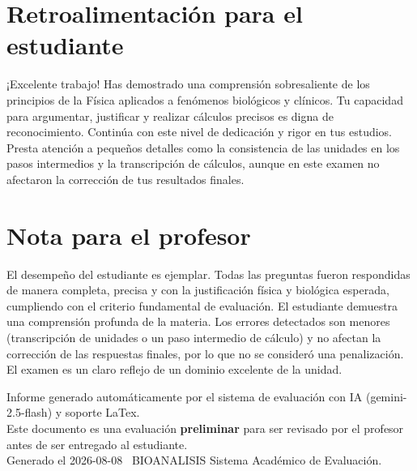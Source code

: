 \documentclass[11pt,a4paper]{article}
\begin{document}
\section*{Retroalimentación para el estudiante}
\begin{tcolorbox}[cajaRecomendacion, title={Dirigido a: Maria Frontado}]
¡Excelente trabajo! Has demostrado una comprensión sobresaliente de los principios de la Física aplicados a fenómenos biológicos y clínicos. Tu capacidad para argumentar, justificar y realizar cálculos precisos es digna de reconocimiento. Continúa con este nivel de dedicación y rigor en tus estudios. Presta atención a pequeños detalles como la consistencia de las unidades en los pasos intermedios y la transcripción de cálculos, aunque en este examen no afectaron la corrección de tus resultados finales.
\end{tcolorbox}

\section*{Nota para el profesor}
\begin{tcolorbox}[
  enhanced, breakable,
  colback=yellow!8, colframe=yellow!60!black,
  fonttitle=\bfseries, coltitle=black,
  title={Observaciones para revisión manual},
  top=4pt, bottom=4pt, left=8pt, right=8pt,
]
El desempeño del estudiante es ejemplar. Todas las preguntas fueron respondidas de manera completa, precisa y con la justificación física y biológica esperada, cumpliendo con el criterio fundamental de evaluación. El estudiante demuestra una comprensión profunda de la materia. Los errores detectados son menores (transcripción de unidades o un paso intermedio de cálculo) y no afectan la corrección de las respuestas finales, por lo que no se consideró una penalización. El examen es un claro reflejo de un dominio excelente de la unidad.
\end{tcolorbox}

\vspace{12pt}
\begin{center}
  \footnotesize\color{gray}
  Informe generado automáticamente por el sistema de evaluación con IA (gemini-2.5-flash) y soporte LaTex. \\
  Este documento es una evaluación \textbf{preliminar} para ser revisado por el profesor antes de ser entregado al 
  estudiante. \\
  Generado el 2026-08-08 \textbullet\ BIOANALISIS Sistema Académico de Evaluación.
  \end{center}
\end{document}
